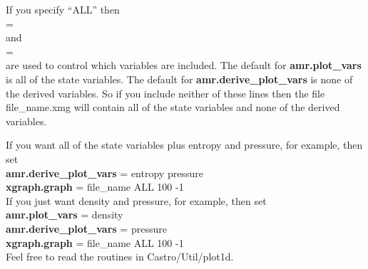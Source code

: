 \noindent If you specify ``ALL'' then \\

 = \\

\noindent and \\

 = \\

\noindent are used to control which variables are included.  The default for {\bf amr.plot\_vars}
is all of the state variables.  The default for {\bf amr.derive\_plot\_vars} is none of
the derived variables.  So if you include neither of these lines then the file 
file\_name.xmg will contain all of the state variables and none of the derived variables.

If you want all of the state variables plus entropy and pressure, for example, then set \\

{\bf amr.derive\_plot\_vars} = entropy pressure \\

{\bf xgraph.graph} = file\_name ALL 100 -1\\

If you just want density and pressure, for example, then set \\

{\bf amr.plot\_vars} =  density \\

{\bf amr.derive\_plot\_vars} = pressure \\

{\bf xgraph.graph} = file\_name ALL 100 -1\\ 

Feel free to read the routines in Castro/Util/plot1d.

